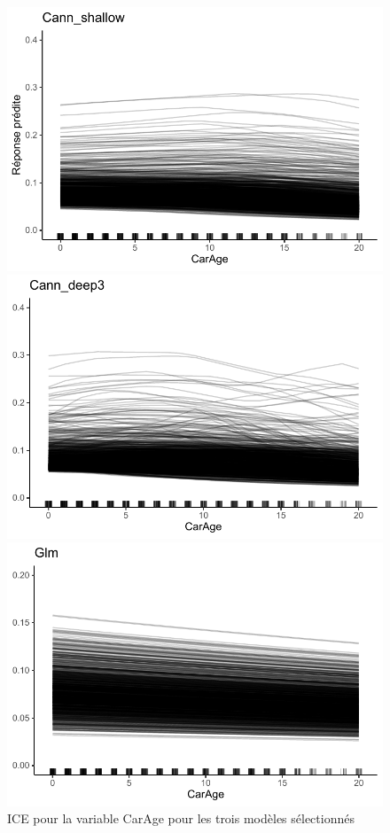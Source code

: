 \begin{figure}
\caption{\label{fig:ice3Car} ICE pour la variable CarAge pour les trois modèles sélectionnés}
\centering
\begin{minipage}{0.45\linewidth}
\includegraphics[scale=0.6]{Graphiques/iceCarShallow}
\end{minipage}
\hfill
\begin{minipage}{0.45\linewidth}
\includegraphics[scale=0.6]{Graphiques/iceCarCann}
\end{minipage}
\hfill
\begin{minipage}{0.45\linewidth}
\includegraphics[scale=0.6]{Graphiques/iceCarGlm}

\end{minipage}
\end{figure}
